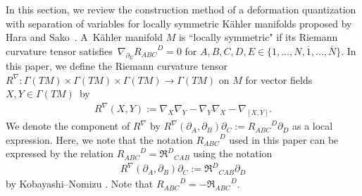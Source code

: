 \documentclass[pdftex]{sigma}
\numberwithin{equation}{section}
\begin{document}
In this section, we review the construction method of a deformation quantization with separation of variables for locally symmetric K\"ahler manifolds proposed by Hara and Sako~\cite{HS1,HS2}. A~K\"ahler manifold $M$ is ``locally symmetric" if its Riemann curvature tensor satisfies~$
\nabla_{\partial_{E}}
{R_{ABC}}^{D}\allowbreak
=
0
$
for
$
A,
B,
C,
D,
E
\in
\bigl\{
1,\dots,N,
\overline{1},\dots,\overline{N}
\bigr\}
$.
In this paper, we define the Riemann curvature tensor
$
R^{\nabla}
\colon
\Gamma(TM)
\times
\Gamma(TM)
\times
\Gamma(TM)
\to
\Gamma(TM)
$
on $M$ for vector fields~${
X,Y
\in
\Gamma(TM)
}$~by
\begin{align*}
R^{\nabla}
 (X,Y )
:=
\nabla_{X}
\nabla_{Y}
-
\nabla_{Y}
\nabla_{X}
-
\nabla_{[X,Y]}.
\end{align*}
We denote the component of $R^{\nabla}$ by
$
R^{\nabla}
 (
\partial_{A},
\partial_{B}
 )
\partial_{C}
:=
{R_{ABC}}^{D}
\partial_{D}
$
as a local expression. Here, we note that the notation ${R_{ABC}}^{D}$ used in this paper can be expressed by the relation
$
{R_{ABC}}^{D}
=
{\mathfrak{R}^{D}}_{CAB}
$
using the notation
\begin{align}
R^{\nabla}
 (
\partial_{A},
\partial_{B}
 )
\partial_{C}
:=
{\mathfrak{R}^{D}}_{CAB}
\partial_{D}
\label{Riem_curv_KN}
\end{align}
by Kobayashi--Nomizu \cite{KN}. Note that
${R_{ABC}}^{D}=-{\mathfrak{R}_{ABC}}^{D}$.
\end{document}
